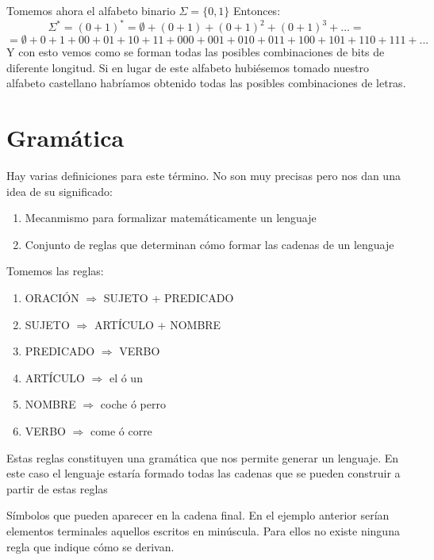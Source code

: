 \documentclass{apuntes}
\begin{document}
Tomemos ahora el alfabeto binario $\Sigma = \lbrace 0, 1 \rbrace$
Entonces:
\[\Sigma ^* = (0+1)^* = \emptyset + (0+1)+(0+1)^2+(0+1)^3+... = \]
\[= \emptyset + 0 + 1 + 00 + 01 +10 +11 +000+001+010+011+100+101+110+111+...\]
Y con esto vemos como se forman todas las posibles combinaciones de bits de diferente longitud. Si en lugar de este alfabeto hubiésemos tomado nuestro alfabeto castellano habríamos obtenido todas las posibles combinaciones de letras.

\section{Gramática}
\begin{defn}[Gramática]
Hay varias definiciones para este término. No son muy precisas pero nos dan una idea de su significado:
\begin{enumerate}
\item Mecanmismo para formalizar matemáticamente un lenguaje
\item Conjunto de reglas que determinan cómo formar las cadenas de un lenguaje
\end{enumerate}
\end{defn}

\begin{example}
Tomemos las reglas:
\begin{enumerate}
\item ORACIÓN $\Rightarrow$ SUJETO + PREDICADO
\item SUJETO $\Rightarrow$ ARTÍCULO + NOMBRE
\item PREDICADO $\Rightarrow$ VERBO
\item ARTÍCULO $\Rightarrow$ el ó un
\item NOMBRE $\Rightarrow$ coche ó perro
\item VERBO $\Rightarrow$ come ó corre
\end{enumerate}
Estas reglas constituyen una gramática que nos permite generar un lenguaje. En este caso el lenguaje estaría formado todas las cadenas que se pueden construir a partir de estas reglas
\end{example}

\begin{defn}
Símbolos que pueden aparecer en la cadena final. En el ejemplo anterior serían elementos terminales aquellos escritos en minúscula. Para ellos no existe ninguna regla que indique cómo se derivan.
\end{defn}
\end{document}
